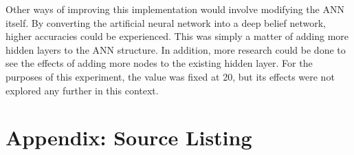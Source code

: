 \documentclass{article}
\begin{document}
Other ways of improving this implementation would involve modifying the ANN itself. By converting the artificial neural network into a deep belief network, higher accuracies could be experienced. This was simply a matter of adding more hidden layers to the ANN structure. In addition, more research could be done to see the effects of adding more nodes to the existing hidden layer. For the purposes of this experiment, the value was fixed at 20, but its effects were not explored any further in this context.




\newpage
\appendix
\section{Appendix: Source Listing}
\label{sec:source}







\end{document}
